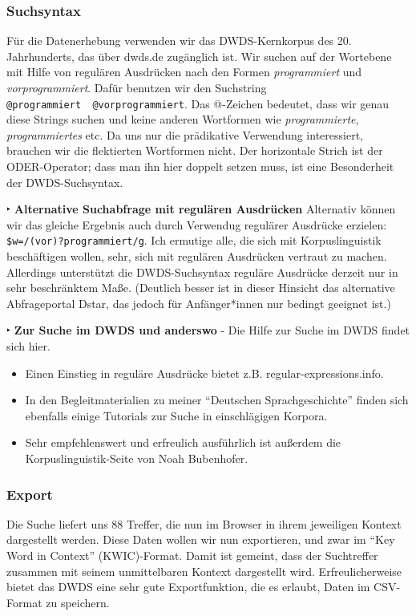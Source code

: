 \documentclass[]{article}
\begin{document}
\subsubsection{Suchsyntax}\label{suchsyntax}

Für die Datenerhebung verwenden wir das DWDS-Kernkorpus des 20.
Jahrhunderts, das über dwds.de zugänglich ist. Wir suchen auf der
Wortebene mit Hilfe von regulären Ausdrücken nach den Formen
\emph{programmiert} und \emph{vorprogrammiert}. Dafür benutzen wir den
Suchstring
\texttt{@programmiert\ \textbar{}\textbar{}\ @vorprogrammiert}. Das
@-Zeichen bedeutet, dass wir genau diese Strings suchen und keine
anderen Wortformen wie \emph{programmierte}, \emph{programmiertes} etc.
Da uns nur die prädikative Verwendung interessiert, brauchen wir die
flektierten Wortformen nicht. Der horizontale Strich \textbar{} ist der
ODER-Operator; dass man ihn hier doppelt setzen muss, ist eine
Besonderheit der DWDS-Suchsyntax.

‣ \textbf{Alternative Suchabfrage mit regulären Ausdrücken} Alternativ
können wir das gleiche Ergebnis auch durch Verwendug regulärer Ausdrücke
erzielen: \texttt{\$w=/(vor)?programmiert/g}. Ich ermutige alle, die
sich mit Korpuslinguistik beschäftigen wollen, sehr, sich mit regulären
Ausdrücken vertraut zu machen. Allerdings unterstützt die
DWDS-Suchsyntax reguläre Ausdrücke derzeit nur in sehr beschränktem
Maße. (Deutlich besser ist in dieser Hinsicht das alternative
Abfrageportal Dstar, das jedoch für Anfänger*innen nur bedingt geeignet
ist.)

 ‣ \textbf{Zur Suche im DWDS und anderswo} - Die Hilfe zur Suche im DWDS
findet sich hier.

\begin{itemize}
\item
  Einen Einstieg in reguläre Ausdrücke bietet z.B.
  regular-expressions.info.
\item
  In den Begleitmaterialien zu meiner ``Deutschen Sprachgeschichte''
  finden sich ebenfalls einige Tutorials zur Suche in einschlägigen
  Korpora.
\item
  Sehr empfehlenswert und erfreulich ausführlich ist außerdem die
  Korpuslinguistik-Seite von Noah Bubenhofer. 
\end{itemize}

\subsubsection{Export}\label{export}

Die Suche liefert uns 88 Treffer, die nun im Browser in ihrem jeweiligen
Kontext dargestellt werden. Diese Daten wollen wir nun exportieren, und
zwar im ``Key Word in Context'' (KWIC)-Format. Damit ist gemeint, dass
der Suchtreffer zusammen mit seinem unmittelbaren Kontext dargestellt
wird. Erfreulicherweise bietet das DWDS eine sehr gute Exportfunktion,
die es erlaubt, Daten im CSV-Format zu speichern.
\end{document}
